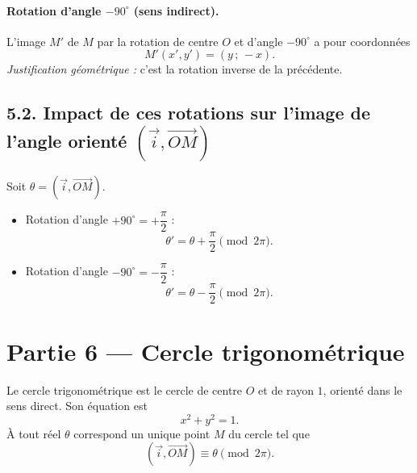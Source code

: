 \documentclass[11pt,a4paper]{article}
\begin{document}
\paragraph{Rotation d'angle $-90^\circ$ (sens indirect).}

L'image $M'$ de $M$ par la rotation de centre $O$ et d'angle $-90^\circ$ a pour coordonnées
\[
M'(x',y')=(y\,;\,-x).
\]
\textit{Justification géométrique :} c'est la rotation inverse de la précédente.

\subsection*{5.2. Impact de ces rotations sur l'image de l'angle orienté $(\vec{i},\overrightarrow{OM})$}

Soit $\theta=\left(\vec{i},\overrightarrow{OM}\right)$.

\begin{itemize}
  \item Rotation d'angle $+90^\circ=+\dfrac{\pi}{2}$ :
  \[
  \theta'=\theta+\dfrac{\pi}{2}\pmod{2\pi}.
  \]

  \item Rotation d'angle $-90^\circ=-\dfrac{\pi}{2}$ :
  \[
  \theta'=\theta-\dfrac{\pi}{2}\pmod{2\pi}.
  \]
\end{itemize}

\clearpage
\section*{Partie 6 — Cercle trigonométrique}

Le cercle trigonométrique est le cercle de centre $O$ et de rayon $1$, orienté dans le sens direct. Son équation est
\[
x^2+y^2=1.
\]
À tout réel $\theta$ correspond un unique point $M$ du cercle tel que
\[
\left(\vec{i},\overrightarrow{OM}\right)\equiv \theta\pmod{2\pi}.
\]

\begin{center}
\end{center}
\end{document}

